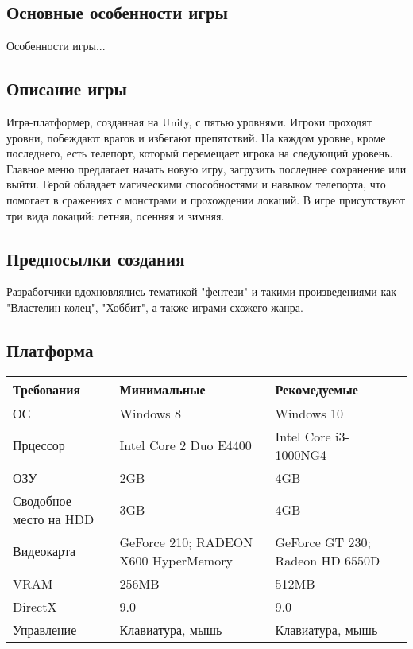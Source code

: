 \documentclass{article}
\begin{document}
\subsection{Основные особенности игры}
Особенности игры...

\subsection{Описание игры}
Игра-платформер, созданная на Unity, с пятью уровнями. Игроки проходят уровни, побеждают врагов и избегают препятствий. На каждом уровне, кроме последнего, есть телепорт, который перемещает игрока на следующий уровень. Главное меню предлагает начать новую игру, загрузить последнее сохранение или выйти. Герой обладает магическими способностями и навыком телепорта, что помогает в сражениях с монстрами и прохождении локаций. В игре присутствуют три вида локаций: летняя, осенняя и зимняя. 

\subsection{Предпосылки создания}
 Разработчики вдохновлялись тематикой "фентези" и такими произведениями как "Властелин колец", "Хоббит", а также играми схожего жанра.
\subsection{Платформа}

\begin{table}
    \begin{tabularx}{\textwidth}{|X|X|X|} \hline  
         Требования&  Минимальные& Рекомедуемые\\ \hline  
         ОС&  Windows 8& Windows 10\\ \hline  
         Прцессор&  Intel Core 2 Duo E4400& Intel Core i3-1000NG4\\ \hline  
         ОЗУ&  2GB& 4GB\\ \hline  
         Сводобное место на HDD&  3GB& 4GB\\ \hline  
         Видеокарта&   GeForce 210; RADEON X600  HyperMemory&  GeForce GT 230; Radeon HD 6550D\\ \hline  
         VRAM&  256MB& 512MB\\ \hline  
         DirectX&  9.0& 9.0\\ \hline  
         Управление&  Клавиатура, мышь& Клавиатура, мышь\\ \hline 
    \end{tabularx}
    
    
\end{table}
\end{document}
